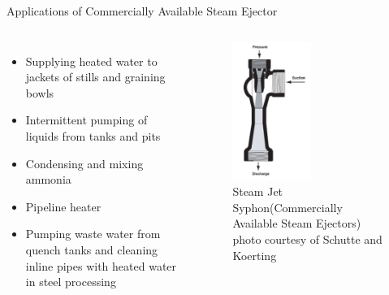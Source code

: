 \begin{frame}{Applications of Commercially Available Steam Ejector\cite{SchutteandKoerting}}
  \begin{columns}
    \begin{itemize}
        \item Supplying heated water to jackets of stills and graining bowls
        \item Intermittent pumping of liquids from tanks and pits
        \item Condensing and mixing ammonia
        \item Pipeline heater
        \item Pumping waste water from quench tanks and cleaning inline pipes with heated water in steel processing
    \end{itemize}
    \begin{figure}
        \centering
        \includegraphics[height=4.5cm]{images/schutteandkoertingthermosyphon.png}
        \caption{\centering Steam Jet Syphon(Commercially Available Steam Ejectors) photo courtesy of Schutte and Koerting \cite{SchutteandKoerting}}
    \end{figure}
  \end{columns}
\end{frame}

